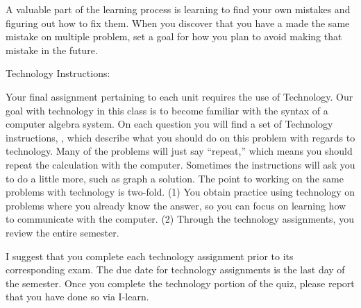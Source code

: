 {A valuable part of the learning process is learning to find your own mistakes and figuring out how to fix them. When you discover that you have a made the same mistake on multiple problem, set a goal for how you plan to avoid making that mistake in the future.


\bigskip \noindent Technology Instructions:

Your final assignment pertaining to each unit requires the use of Technology. Our goal with technology in this class is to become familiar with the syntax of a computer algebra system. On each question you will find a set of Technology instructions, \tech{}, which describe what you should do on this problem with regards to technology. Many of the problems will just say ``repeat,'' which means you should repeat the calculation with the computer. Sometimes the instructions will ask you to do a little more, such as graph a solution. The point to working on the same problems with technology is two-fold. (1) You obtain practice using technology on problems where you already know the answer, so you can focus on learning how to communicate with the computer. (2) Through the technology assignments, you review the entire semester. 

I suggest that you complete each technology assignment prior to its corresponding exam. The due date for technology assignments is the last day of the semester.  Once you complete the technology portion of the quiz, please report that you have done so via I-learn. 


}
